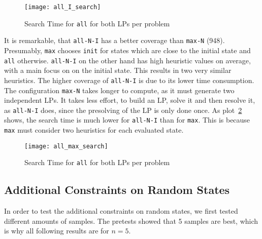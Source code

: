 \begin{figure}[h!]
\centering
    \texttt{[image: all\_I\_search]}
    \caption{Search Time  for \texttt{all} for both LPs per problem}
    \label{fig:search_all}
\end{figure}

It is remarkable, that \texttt{all-N-I} has a better coverage than \texttt{max-N} (948).
Presumably, \texttt{max} chooses \texttt{init} for states which are close to the initial state and \texttt{all} otherwise.
\texttt{all-N-I} on the other hand has high heuristic values on average, with a main focus on on the initial state.
This results in two very similar heuristics.
The higher coverage of \texttt{all-N-I} is due to its lower time consumption.
The configuration \texttt{max-N} takes longer to compute, as it must generate two independent LPs.
It takes less effort, to build an LP, solve it and then resolve it, as \texttt{all-N-I} does, since the presolving of the LP is only done once.
As plot~\ref{fig:search_max_all} shows, the search time is much lower for \texttt{all-N-I} than for \texttt{max}.
This is because \texttt{max} must consider two heuristics for each evaluated state.

\begin{figure}[h!]
\centering
    \texttt{[image: all\_max\_search]}
    \caption{Search Time  for \texttt{all} for both LPs per problem}
    \label{fig:search_max_all}
\end{figure}

\subsection{Additional Constraints on Random States}\label{subsec:additional-constraint-on-random-states}
In order to test the additional constraints on random states, we first tested different amounts of samples.
The pretests showed that 5 samples are best, which is why all following results are for $n=5$.

